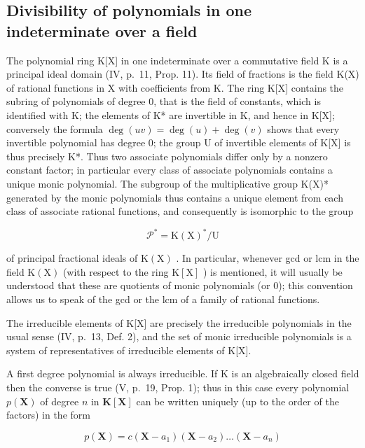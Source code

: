 \subsection{Divisibility of polynomials in one indeterminate over a field}

The polynomial ring K{[}X{]} in one indeterminate over a commutative field K is a principal ideal domain (IV, p.~11, Prop. 11). Its field of fractions is the field K(X) of rational functions in X with coefficients from K. The ring K{[}X{]} contains the subring of polynomials of degree 0, that is the field of constants, which is identified with K; the elements of K* are invertible in K, and hence in K{[}X{]}; conversely the formula \(\deg(uv) = \deg(u) + \deg(v)\) shows that every invertible polynomial has degree 0; the group U of invertible elements of K{[}X{]} is thus precisely K*. Thus two associate polynomials differ only by a nonzero constant factor; in particular every class of associate polynomials contains a unique monic polynomial. The subgroup of the multiplicative group K(X)* generated by the monic polynomials thus contains a unique element from each class of associate rational functions, and consequently is isomorphic to the group

\[
\mathcal {P} ^ {*} = \mathrm{K} (\mathrm{X}) ^ {*} / \mathrm{U}
\]

of principal fractional ideals of \(\mathrm{K}(\mathrm{X})\) . In particular, whenever gcd or lcm in the field \(\mathrm{K}(\mathrm{X})\) (with respect to the ring \(\mathrm{K}[\mathrm{X}]\) ) is mentioned, it will usually be understood that these are quotients of monic polynomials (or 0); this convention allows us to speak of the gcd or the lcm of a family of rational functions.

The irreducible elements of K{[}X{]} are precisely the irreducible polynomials in the usual sense (IV, p.~13, Def. 2), and the set of monic irreducible polynomials is a system of representatives of irreducible elements of K{[}X{]}.

A first degree polynomial is always irreducible. If K is an algebraically closed field then the converse is true (V, p.~19, Prop. 1); thus in this case every polynomial \(p(\mathbf{X})\) of degree \(n\) in \(\mathbf{K}[\mathbf{X}]\) can be written uniquely (up to the order of the factors) in the form

\[
p (\mathbf {X}) = c \left(\mathbf {X} - a _ {1}\right) \left(\mathbf {X} - a _ {2}\right) \dots \left(\mathbf {X} - a _ {n}\right)
\]

